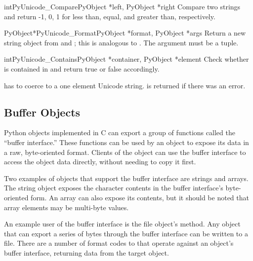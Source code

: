 \begin{cfuncdesc}{int}{PyUnicode_Compare}{PyObject *left, PyObject *right}
  Compare two strings and return -1, 0, 1 for less than, equal, and
  greater than, respectively.
\end{cfuncdesc}

\begin{cfuncdesc}{PyObject*}{PyUnicode_Format}{PyObject *format,
                                              PyObject *args}
  Return a new string object from  and ; this
  is analogous to .  The
   argument must be a tuple.
\end{cfuncdesc}

\begin{cfuncdesc}{int}{PyUnicode_Contains}{PyObject *container,
                                           PyObject *element}
  Check whether  is contained in  and
  return true or false accordingly.

   has to coerce to a one element Unicode
  string.  is returned if there was an error.
\end{cfuncdesc}


\subsection{Buffer Objects \label{bufferObjects}}

Python objects implemented in C can export a group of functions called
the ``buffer interface.''  These functions can
be used by an object to expose its data in a raw, byte-oriented
format. Clients of the object can use the buffer interface to access
the object data directly, without needing to copy it first.

Two examples of objects that support
the buffer interface are strings and arrays. The string object exposes
the character contents in the buffer interface's byte-oriented
form. An array can also expose its contents, but it should be noted
that array elements may be multi-byte values.

An example user of the buffer interface is the file object's
 method. Any object that can export a series of bytes
through the buffer interface can be written to a file. There are a
number of format codes to  that operate
against an object's buffer interface, returning data from the target
object.

